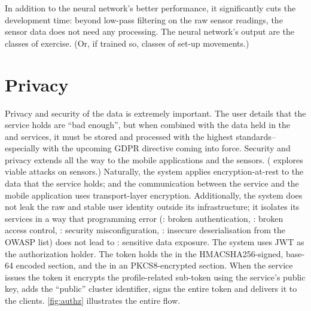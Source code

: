 In addition to the neural network's better performance, it significantly cuts the development time: beyond low-pass filtering on the raw sensor readings, the sensor data does not need any processing. The neural network's output are the classes of exercise. (Or, if trained so, classes of set-up movements.)



\section{Privacy}
Privacy and security of the data is extremely important. The user details that the  service holds are ``bad enough'', but when combined with the data held in the  and  services, it must be stored and processed with the highest standards--especially with the upcoming GDPR\cite{gdpr} directive coming into force. Security and privacy extends all the way to the mobile applications and the sensors. (\cite{Fu:AuI932n8} explores viable attacks on sensors.) Naturally, the system applies encryption-at-rest to the data that the  service holds; and the communication between the  service and the mobile application uses transport-layer encryption. Additionally, the system does not leak the raw and stable user identity outside its infrastructure; it isolates its services in a way that programming error (: broken authentication, : broken access control, : security misconfiguration, : insecure deserialisation from the OWASP\cite{owasp} list) does not lead to : sensitive data exposure. The system uses JWT\cite{jwt} as the authorization holder. The token holds the  in the HMACSHA256-signed, base-64 encoded section, and the  in an PKCS8-encrypted section. When the  service issues the token it encrypts the profile-related sub-token using the  service's public key, adds the ``public'' cluster identifier, signs the entire token and delivers it to the clients. \autoref{fig:authz} illustrates the entire flow.

